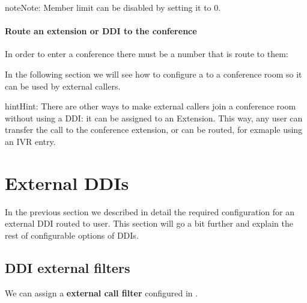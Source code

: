 \documentclass[letterpaper,10pt,english]{sphinxmanual}
\begin{document}
\begin{notice}{note}{Note:}
Member limit can be disabled by setting it to 0.
\end{notice}
\paragraph{Route an extension or DDI to the conference}

In order to enter a conference there must be a number that is route to them:

\noindent{}

In the following section we will see how to configure a {\hyperref[pbx_features/external_ddis:external\string-ddis]{}} to a conference room so it can be used by external callers.

\begin{notice}{hint}{Hint:}
There are other ways to make external callers join a conference room
without using a DDI: it can be assigned to an Extension. This way, any user
can transfer the call to the conference extension, or can be routed, for
exmaple using an IVR entry.
\end{notice}


\section{External DDIs}
\label{pbx_features/external_ddis:external-ddis}\label{pbx_features/external_ddis::doc}\label{pbx_features/external_ddis:id1}
In the previous section {\hyperref[external_incoming_calls/configure_ddi:settingup\string-ddi]{}} we described in detail the required
configuration for an external DDI routed to user. This section will go a bit
further and explain the rest of configurable options of DDIs.


\subsection{DDI external filters}
\label{pbx_features/external_ddis:ddi-external-filters}
We can assign a \textbf{external call filter} configured in {\hyperref[pbx_features/external_filters:external\string-filters]{}}.

\noindent{}
\end{document}
